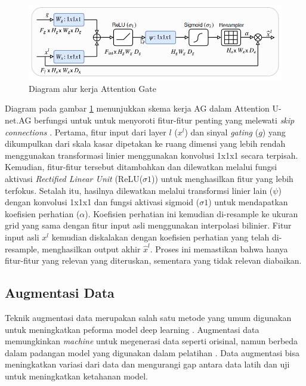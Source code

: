 \begin{figure}[H]
	\centering
	\includegraphics[scale=.6]{gambar/AG.png}
	\caption{Diagram alur kerja Attention Gate}
	\label{fig:AG}
\end{figure}

Diagram pada gambar \ref{fig:AG} menunjukkan skema kerja AG dalam Attention U-net.AG berfungsi untuk untuk menyoroti fitur-fitur penting yang melewati \textit{skip connections} \cite{siddique_u-net_2020,oktay_attention_2018}. Pertama, fitur input dari layer \(l\) (\(x^l\))  dan sinyal \textit{gating} (\(g\)) yang dikumpulkan dari skala kasar dipetakan ke ruang dimensi yang lebih rendah menggunakan transformasi linier menggunakan konvolusi 1x1x1 secara terpisah. Kemudian, fitur-fitur tersebut ditambahkan dan dilewatkan melalui fungsi aktivasi \textit{Rectified Linear Unit} (ReLU($\sigma1$)) untuk menghasilkan fitur yang lebih terfokus. Setalah itu, hasilnya dilewatkan melalui transformsi linier lain ($\psi$) dengan konvolusi 1x1x1 dan fungsi aktivasi sigmoid ($\sigma1$) untuk mendapatkan koefisien perhatian ($\alpha$). Koefisien perhatian ini kemudian di-resample ke ukuran grid yang sama dengan fitur input asli menggunakan interpolasi bilinier. Fitur input asli \(x^l\) kemudian diskalakan dengan koefisien perhatian yang telah di-resample, menghasilkan output akhir $\hat{x}^l$. Proses ini memastikan bahwa hanya fitur-fitur yang relevan yang diteruskan, sementara yang tidak relevan diabaikan.




\subsection{Augmentasi Data}

\noindent Teknik augmentasi data merupakan salah satu metode yang umum digunakan untuk meningkatkan peforma model deep learning \cite{minaee_image_2020}. Augmentasi data memungkinkan \textit{machine} untuk megenerasi data seperti orisinal, namun berbeda dalam padangan model yang digunakan dalam pelatihan \cite{huang_fully_2020}. Data augmentasi bisa meningkatkan variasi dari data dan mengurangi gap antara data latih dan uji untuk meningkatkan ketahanan model.

